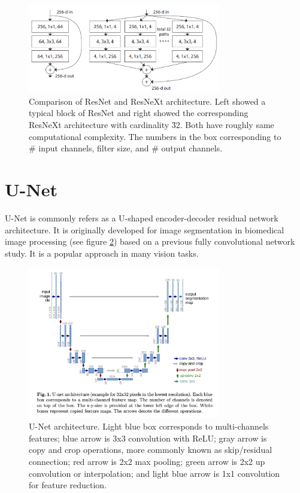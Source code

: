 \begin{figure}
    \centering
    \includegraphics[width=0.75\textwidth]{images/preliminary/resnet_resnext_cmp.png}
    \caption{Comparison of ResNet and ResNeXt architecture. Left showed a typical block of ResNet and right showed the corresponding ResNeXt architecture with cardinality \= 32. Both have roughly same computational complexity. The numbers in the box corresponding to \# input channels, filter size, and \# output channels.\cite{xieAggregatedResidualTransformations2017a}} 
    \label{fig:resnet_resnext_cmp}
\end{figure}

\section{U-Net}
U-Net\cite{ronnebergerUNetConvolutionalNetworks2015} is commonly refers as a U-shaped encoder-decoder residual network architecture. It is originally developed for image segmentation in biomedical image processing (see figure \ref{fig:unet_arch}) based on a previous fully convolutional network study\cite{longFullyConvolutionalNetworks2015}. It is a popular approach in many vision tasks.

\begin{figure}
    \centering
    \includegraphics[width=0.75\textwidth]{images/preliminary/unet_arch.png}
    \caption{U-Net architecture. Light blue box corresponds to multi-channels features; blue arrow is 3x3 convolution with ReLU; gray arrow is copy and crop operations, more commonly known as skip/residual connection; red arrow is 2x2 max pooling; green arrow is 2x2 up convolution or interpolation; and light blue arrow is 1x1 convolution for feature reduction.\cite{ronnebergerUNetConvolutionalNetworks2015}} 
    \label{fig:unet_arch}
\end{figure}

